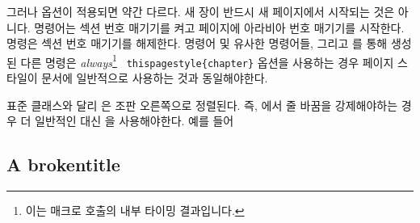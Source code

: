 그러나  옵션이 적용되면 약간 다르다. 새 장이 반드시 새 페이지에서 시작되는 것은 아니다.
\cmd{\mainmatter} 명령어는 섹션 번호 매기기를 켜고 페이지에 아라비아 번호 매기기를 시작한다. \cmd{\backmatter} 명령은 섹션 번호 매기기를 해제한다.
\cmd{\tableofcontents} 명령어 및 유사한 명령어들, 그리고 \cmd{\newlistof}를 통해 생성 된 다른 명령은 \emph{always}\footnote{이는 매크로 호출의 내부 타이밍 결과입니다.} \verb? thispagestyle{chapter}?
옵션을 사용하는 경우  페이지 스타일이 문서에 일반적으로 사용하는 것과 동일해야한다.

표준 클래스와 달리 은 조판 오른쪽으로 정렬된다.
즉, 에서 줄 바꿈을 강제해야하는 경우 더 일반적인 \cmd{\\} 대신 \cmd{\newline}을 사용해야한다. 예를 들어
\begin{lcode}
\section{A broken\newline title}
\end{lcode}

